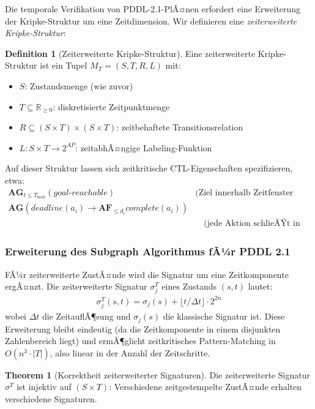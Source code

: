 ﻿\documentclass[a4paper,12pt]{article}
\theoremstyle{definition}
\newtheorem{definition}{Definition}[section]
\newtheorem{theorem}{Theorem}[section]
\begin{document}
Die temporale Verifikation von PDDL-2.1-PlÃ¤nen erfordert eine Erweiterung der Kripke-Struktur um eine Zeitdimension. Wir definieren eine \emph{zeiterweiterte Kripke-Struktur}:

\begin{definition}[Zeiterweiterte Kripke-Struktur]
Eine zeiterweiterte Kripke-Struktur ist ein Tupel $M_T = (S, T, R, L)$ mit:
\begin{itemize}
  \item[-] $S$: Zustandsmenge (wie zuvor)
  \item[-] $T \subseteq \mathbb{R}_{\geq 0}$: diskretisierte Zeitpunktmenge
  \item[-] $R \subseteq (S \times T) \times (S \times T)$: zeitbehaftete Transitionsrelation
  \item[-] $L: S \times T \to 2^{AP}$: zeitabhÃ¤ngige Labeling-Funktion
\end{itemize}
\end{definition}

Auf dieser Struktur lassen sich zeitkritische CTL-Eigenschaften spezifizieren, etwa:
\begin{align}
  \mathbf{AG}_{t \leq T_{\max}}(\mathit{goal\text{-}reachable}) \quad &\text{(Ziel innerhalb Zeitfenster erreichbar)} \\
  \mathbf{AG}(\mathit{deadline}(a_i) \to \mathbf{AF}_{\leq d_i} \mathit{complete}(a_i)) \\
  &\quad\text{(jede Aktion schlieÃŸt in ihrer Dauer ab)}
\end{align}

\subsubsection{Erweiterung des Subgraph Algorithmus fÃ¼r PDDL 2.1}

FÃ¼r zeiterweiterte ZustÃ¤nde wird die Signatur um eine Zeitkomponente ergÃ¤nzt. Die zeiterweiterte Signatur $\sigma_j^T$ eines Zustands $(s, t)$ lautet:
\begin{align}
  \sigma_j^T(s, t) = \sigma_j(s) + \lfloor t / \Delta t \rfloor \cdot 2^{2n}
\end{align}
wobei $\Delta t$ die ZeitauflÃ¶sung und $\sigma_j(s)$ die klassische Signatur ist. Diese Erweiterung bleibt eindeutig (da die Zeitkomponente in einem disjunkten Zahlenbereich liegt) und ermÃ¶glicht zeitkritisches Pattern-Matching in $O(n^3 \cdot |T|)$, also linear in der Anzahl der Zeitschritte.

\begin{theorem}[Korrektheit zeiterweiterter Signaturen]
Die zeiterweiterte Signatur $\sigma^T$ ist injektiv auf $(S \times T)$: Verschiedene zeitgestempelte ZustÃ¤nde erhalten verschiedene Signaturen.
\end{theorem}
\end{document}
